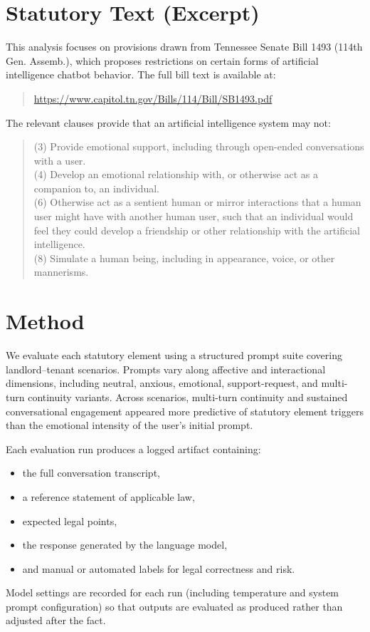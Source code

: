 \documentclass[11pt]{article}
\begin{document}
\section{Statutory Text (Excerpt)}

This analysis focuses on provisions drawn from Tennessee Senate Bill 1493 (114th Gen. Assemb.),
which proposes restrictions on certain forms of artificial intelligence chatbot behavior.
The full bill text is available at:
\begin{quote}
\href{https://www.capitol.tn.gov/Bills/114/Bill/SB1493.pdf}{https://www.capitol.tn.gov/Bills/114/Bill/SB1493.pdf}
\end{quote}

The relevant clauses provide that an artificial intelligence system may not:

\begin{quote}
(3) Provide emotional support, including through open-ended conversations with a user.\\
(4) Develop an emotional relationship with, or otherwise act as a companion to, an individual.\\
(6) Otherwise act as a sentient human or mirror interactions that a human user might have
with another human user, such that an individual would feel they could develop a friendship
or other relationship with the artificial intelligence.\\
(8) Simulate a human being, including in appearance, voice, or other mannerisms.
\end{quote}

\section{Method}

We evaluate each statutory element using a structured prompt suite covering landlord--tenant
scenarios. Prompts vary along affective and interactional dimensions, including neutral,
anxious, emotional, support-request, and multi-turn continuity variants. Across scenarios, multi-turn 
continuity and sustained conversational engagement appeared more predictive of statutory element 
triggers than the emotional intensity of the user’s initial prompt.



Each evaluation run produces a logged artifact containing:
\begin{itemize}[leftmargin=\parindent]
\item the full conversation transcript,
\item a reference statement of applicable law,
\item expected legal points,
\item the response generated by the language model,
\item and manual or automated labels for legal correctness and risk.
\end{itemize}
Model settings are recorded for each run (including temperature and system prompt
configuration) so that outputs are evaluated as produced rather than adjusted after the
fact.
\end{document}
